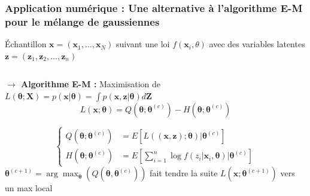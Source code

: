 \begin{frame}
    \frametitle{Application numérique : Une alternative à l'algorithme E-M pour le mélange de gaussiennes}
    \small
    \'Echantillon $\boldsymbol{x}=\left(\boldsymbol{x}_{1}, \ldots, \boldsymbol{x}_{N}\right)$ suivant une loi 
    $f\left(\boldsymbol{x}_{i}, \theta\right)$ 
    avec des variables latentes $\boldsymbol{z}=\left(\boldsymbol{z}_{1}, \boldsymbol{z}_{2}, \dots, \boldsymbol{z}_{n}\right)$\\
    
    \begin{columns}
        \begin{column}{0.8\textwidth}
            
            \textbf{$\rightarrow$ Algorithme E-M : } Maximisation de $L(\boldsymbol{\theta} ; \mathbf{X})=p(\mathbf{x} | \boldsymbol{\theta})=\int p(\mathbf{x}, \mathbf{z} | \boldsymbol{\theta}) d \mathbf{Z}$
            $$
            L(\mathbf{x} ; \boldsymbol{\theta})=Q\left(\boldsymbol{\theta} ; \boldsymbol{\theta}^{(c)}\right)-H\left(\boldsymbol{\theta} ; \boldsymbol{\theta}^{(c)}\right)
            $$

            $$\left\{\begin{aligned}
                Q\left(\boldsymbol{\theta} ; \boldsymbol{\theta}^{(c)}\right) &=E \left[L((\mathbf{x}, \mathbf{z}) ; \boldsymbol{\theta}) | \boldsymbol{\theta}^{(c)}\right] \\
                H\left(\boldsymbol{\theta} ; \boldsymbol{\theta}^{(c)}\right) &= E\left[\sum_{i=1}^{n} \log f\left(z_{i} | \boldsymbol{x}_{i}, \boldsymbol{\theta}\right) | \boldsymbol{\theta}^{(c)}\right]
            \end{aligned}\right.$$
            $
            \boldsymbol{\theta}^{(c+1)}=\arg \max _{\boldsymbol{\theta}}\left(Q\left(\boldsymbol{\theta}, \boldsymbol{\theta}^{(c)}\right)\right)
            $ fait tendre la suite $L\left(\mathbf{x} ; \boldsymbol{\theta}^{(c+1)}\right)$ vers un max local  
            
    \end{column}


\end{columns}
\end{frame}
